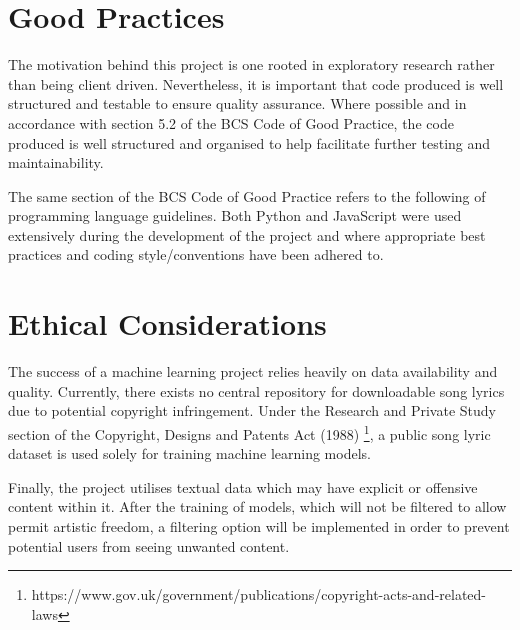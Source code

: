 \section{Good Practices}
The motivation behind this project is one rooted in exploratory research rather than being client driven. Nevertheless, it is important that code produced is well structured and testable to ensure quality assurance. Where possible and in accordance with section 5.2 of the BCS Code of Good Practice, the code produced is well structured and organised to help facilitate further testing and maintainability. 

\noindent
\newline
The same section of the BCS Code of Good Practice refers to the following of programming language guidelines. Both Python and JavaScript were used extensively during the development of the project and where appropriate best practices and coding style/conventions have been adhered to. 

\section{Ethical Considerations}
The success of a machine learning project relies heavily on data availability and quality. Currently, there exists no central repository for downloadable song lyrics due to potential copyright infringement. Under the Research and Private Study section of the Copyright, Designs and Patents Act (1988) \footnote{https://www.gov.uk/government/publications/copyright-acts-and-related-laws}, a public song lyric dataset is used solely for training machine learning models.  

\noindent
\newline
Finally, the project utilises textual data which may have explicit or offensive content within it. After the training of models, which will not be filtered to allow permit artistic freedom, a filtering option will be implemented in order to prevent potential users from seeing unwanted content.